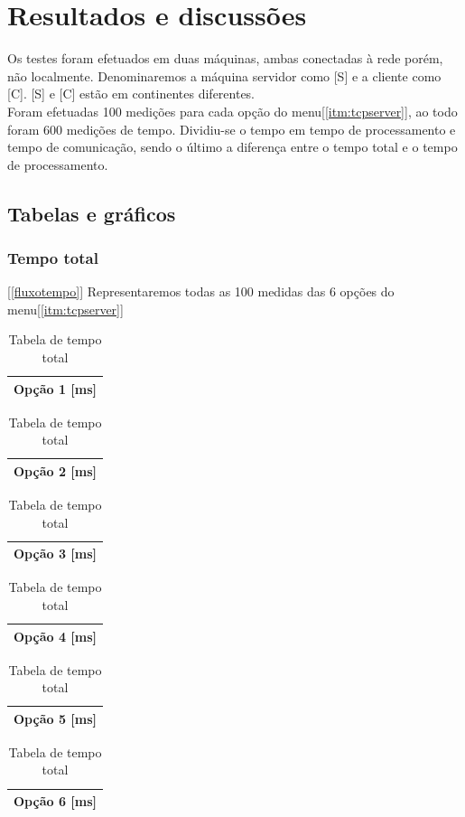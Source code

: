 \documentclass[a4paper,10pt]{article}
\begin{document}
\section{Resultados e discussões}
Os testes foram efetuados em duas máquinas, ambas conectadas à rede porém, não localmente. Denominaremos a máquina servidor como [S] e a cliente como [C]. [S] e [C] estão em continentes diferentes.
\\Foram efetuadas 100 medições para cada opção do menu[\ref{itm:tcpserver}], ao todo foram 600 medições de tempo. Dividiu-se o tempo em tempo de processamento e tempo de comunicação, sendo o último a diferença entre o tempo total e o tempo de processamento.
\subsection{Tabelas e gráficos}
\subsubsection{Tempo total}[\ref{fluxotempo}]
Representaremos todas as 100 medidas das 6 opções do menu[\ref{itm:tcpserver}]
\begin{table}
  \tiny
  \centering
  \begin{tabular}{|c|}
    \hline
    Opção 1 [ms] \\
    \hline
        
    \hline
  \end{tabular}
  \begin{tabular}{|c|}
    \hline
    Opção 2 [ms] \\
    \hline
    
    \hline
  \end{tabular}
  \begin{tabular}{|c|}
    \hline
    Opção 3 [ms] \\
    \hline
    
    \hline
  \end{tabular}
  \begin{tabular}{|c|}
    \hline
    Opção 4 [ms] \\
    \hline
    
    \hline
  \end{tabular}
  \begin{tabular}{|c|}
    \hline
    Opção 5 [ms] \\
    \hline
    
    \hline
  \end{tabular}
  \begin{tabular}{|c|}
    \hline
    Opção 6 [ms] \\
    \hline
    
    \hline
  \end{tabular}
  \caption{Tabela de tempo total}
\end{table}
\newpage
\end{document}
